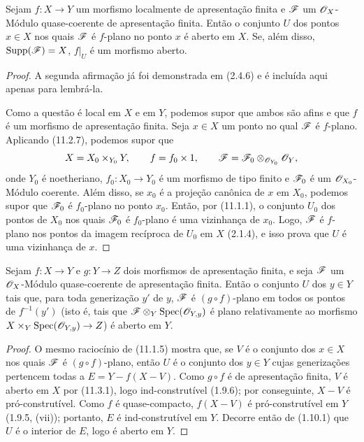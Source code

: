\begin{theorem}[11.3.1]
\label{IV.11.3.1}
Sejam $f:X\to Y$ um morfismo localmente de apresentação finita e
$\mathscr{F}$ um $\mathscr{O}_X$-Módulo quase-coerente de apresentação finita.
Então o conjunto $U$ dos pontos $x\in X$ nos quais $\mathscr{F}$ é
$f$-plano no ponto $x$ é aberto em $X$.
Se, além disso, $\operatorname{Supp}(\mathscr{F})=X$,
$f|_U$ é um morfismo aberto.
\end{theorem}

\begin{proof}
A segunda afirmação já foi demonstrada em (2.4.6) e é incluída
aqui apenas para lembrá-la.

Como a questão é local em $X$ e em $Y$, podemos supor que ambos
são afins e que $f$ é um morfismo de apresentação finita.
Seja $x\in X$ um ponto no qual $\mathscr{F}$ é $f$-plano.
Aplicando (11.2.7), podemos supor que
\[
X=X_0\times_{Y_0}Y,\qquad f=f_0\times1,\qquad
\mathscr{F}=\mathscr{F}_0\otimes_{\mathscr{O}_{Y_0}}\mathscr{O}_Y,
\]
onde $Y_0$ é noetheriano, $f_0:X_0\to Y_0$ é um morfismo
de tipo finito e $\mathscr{F}_0$ é um $\mathscr{O}_{X_0}$-Módulo coerente.
Além disso, se $x_0$ é a projeção canônica de $x$ em $X_0$,
podemos supor que $\mathscr{F}_0$ é $f_0$-plano no ponto $x_0$.
Então, por (11.1.1), o conjunto $U_0$ dos pontos de $X_0$
nos quais $\mathscr{F}_0$ é $f_0$-plano é uma vizinhança de $x_0$.
Logo, $\mathscr{F}$ é $f$-plano nos pontos da imagem recíproca de
$U_0$ em $X$ (2.1.4), e isso prova que $U$ é uma vizinhança de $x$.
\end{proof}


\begin{corollary}[11.3.2]
\label{IV.11.3.2}
Sejam $f:X\to Y$ e $g:Y\to Z$ dois morfismos de apresentação finita,
e seja $\mathscr{F}$ um $\mathscr{O}_X$-Módulo quase-coerente de apresentação
finita. Então o conjunto $U$ dos $y\in Y$ tais que, para toda
generização $y'$ de $y$, $\mathscr{F}$ é $(g\circ f)$-plano em todos os
pontos de $f^{-1}(y')$ (isto é, tais que
$\mathscr{F}\otimes_Y\operatorname{Spec}(\mathscr{O}_{Y,y})$ é plano relativamente
ao morfismo $X\times_Y\operatorname{Spec}(\sh{O}_{Y,y})\to Z$)
é aberto em $Y$.
\end{corollary}

\begin{proof}
O mesmo raciocínio de (11.1.5) mostra que, se $V$ é o conjunto dos
$x\in X$ nos quais $\mathscr{F}$ é $(g\circ f)$-plano, então $U$ é o conjunto
dos $y\in Y$ cujas generizações pertencem todas a
$E=Y-f(X-V)$. Como $g\circ f$ é de apresentação finita, $V$ é aberto
em $X$ por (11.3.1), logo ind-construtível (1.9.6); por conseguinte,
$X-V$ é pró-construtível. Como $f$ é quase-compacto, $f(X-V)$ é
pró-construtível em $Y$ (1.9.5, (vii)); portanto, $E$ é
ind-construtível em $Y$. Decorre então de (1.10.1) que $U$ é o
interior de $E$, logo é aberto em $Y$.
\end{proof}

